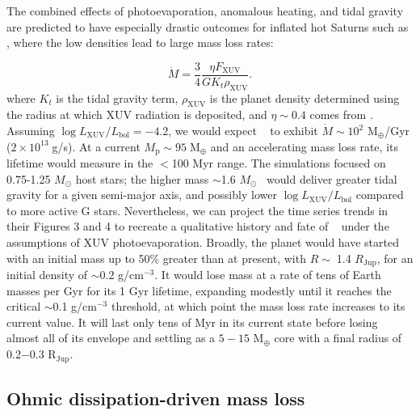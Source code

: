 \documentclass[linenumbers, twocolumn, trackchanges]{aastex631}
\newcommand{\hatp}{\object{HAT-P-67}~}
\newcommand{\hatpb}{\object{HAT-P-67 b}}
\begin{document}
The combined effects of photoevaporation, anomalous heating, and tidal gravity are predicted to have especially drastic outcomes for inflated hot Saturns \citep{2023ApJ...945L..36T} such as \hatpb, where the low densities lead to large mass loss rates:

\begin{equation}
  \dot{M} = \frac{3}{4}\frac{\eta F_\mathrm{XUV}}{G K_t \rho_\mathrm{XUV}}\label{thorn23Mdot}.
\end{equation}
where $K_t$ is the tidal gravity term, $\rho_\mathrm{XUV}$ is the planet density determined using the radius at which XUV radiation is deposited, and $\eta \sim 0.4$ comes from \citet{2022A&A...663A.122C}.  Assuming $\log{L_\mathrm{XUV}/L_\mathrm{bol}}=-4.2$, we would expect \hatpb~ to exhibit $\dot{M}\sim10^2$ M$_\oplus$/Gyr ($2\times10^{13}\;$g/s). At a current $M_\mathrm{p}\sim95\;$M$_\oplus$ and an accelerating mass loss rate, its lifetime would measure in the $<$100 Myr range.  The \citet{2023ApJ...945L..36T} simulations focused on 0.75-1.25 $M_\odot$ host stars; the higher mass $\sim$1.6 $M_\odot$ \hatp would deliver greater tidal gravity for a given semi-major axis, and possibly lower $\log{L_\mathrm{XUV}/L_\mathrm{bol}}$ compared to more active G stars.  Nevertheless, we can project the time series trends in their Figures 3 and 4 to recreate a qualitative history and fate of \hatpb~ under the assumptions of XUV photoevaporation.  Broadly, the planet would have started with an initial mass up to 50$\%$ greater than at present, with $R\sim\;$1.4 $R_\mathrm{Jup}$, for an initial density of $\sim$0.2 g/cm$^{-3}$.  It would lose mass at a rate of tens of Earth masses per Gyr for its 1 Gyr lifetime, expanding modestly until it reaches the critical $\sim$0.1 g/cm$^{-3}$ threshold, at which point the mass loss rate increases to its current value.  It will last only tens of Myr in its current state before losing almost all of its envelope and settling as a $5-15$ M$_\oplus$ core with a final radius of 0.2$-$0.3 R$_\mathrm{Jup}$.


\subsection{Ohmic dissipation-driven mass loss}\label{secOhmicD}
\end{document}
